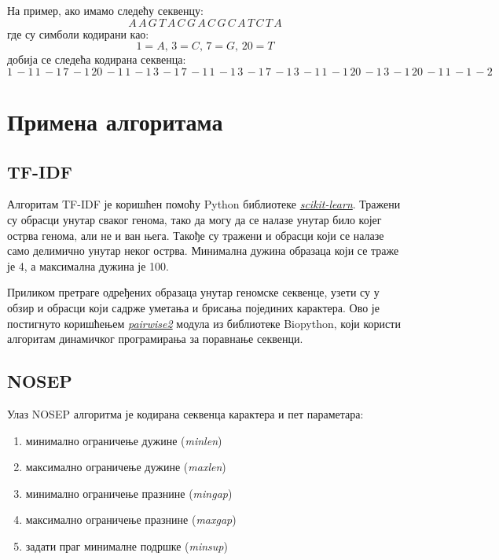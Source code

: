 \documentclass[12pt]{article}
\begin{document}
На пример, ако имамо следећу секвенцу:
$$ A\,  A\, G\, T\, A\, C\, G\, A\, C\, G\, C\, A\, T\, C\, T\, A  $$
где су симболи кодирани као:
$$ 1 = A,\, 3 = C,\, 7 = G,\, 20 = T $$
добија се следећа кодирана секвенца:
$$ 1\, -1\, 1\, -1\, 7\, -1\, 20\, -1\, 1\, -1\, 3\, -1\, 7\, -1\, 1\, -1\, 3\, -1\, 7\, -1\, 3\, -1\, 1\, -1\, 20\, -1\, 3\, -1\, 20\, -1\, 1\, -1\, -2\, $$


\section{Примена алгоритама}

\subsection{TF-IDF}
Алгоритам TF-IDF је коришћен помоћу Python библиотеке \textit{\href{https://scikit-learn.org/}{scikit-learn}}. Тражени су обрасци унутар сваког генома, тако да могу да се налазе унутар било којег острва генома, али не и ван њега. Такође су тражени и обрасци који се налазе само делимично унутар неког острва. Минимална дужина образаца који се траже је 4, а максимална дужина је 100.

Приликом претраге одређених образаца унутар геномске секвенце, узети су у обзир и обрасци који садрже уметања и брисања појединих карактера. Ово је постигнуто коришћењем \textit{\href{https://biopython.org/docs/1.75/api/Bio.pairwise2.html}{pairwise2}} модула из библиотеке Biopython, који користи алгоритам динамичког програмирања за поравнање секвенци.

\subsection{NOSEP}

Улаз NOSEP алгоритма је кодирана секвенца карактера и пет параметара:
\begin{enumerate}
 \item минимално ограничење дужине (\textit{minlen})
 \item максимално ограничење дужине (\textit{maxlen})
 \item минимално ограничење празнине (\textit{mingap})
 \item максимално ограничење празнине (\textit{maxgap})
 \item задати праг минималне подршке (\textit{minsup})\\
\end{enumerate}
\end{document}
